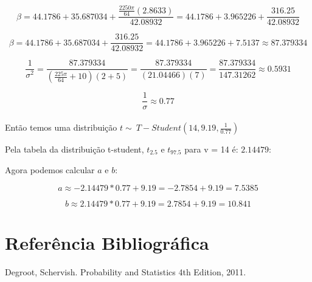 \documentclass{article}
\begin{document}
	$$\beta = 44.1786 + 35.687034 + \frac{\frac{2250\pi}{64}(2.8633)}{42.08932} = 44.1786 + 3.965226 + \frac{316.25}{42.08932}$$
	
	$$\beta = 44.1786 + 35.687034 + \frac{316.25}{42.08932} = 44.1786 + 3.965226 + 7.5137 \approx 87.379334$$
	
	$$\frac{1}{\sigma^2} = \frac{87.379334}{(\frac{225\pi}{64} + 10)(2 + 5)} = \frac{87.379334}{(21.04466)(7)} = \frac{87.379334}{147.31262}\approx 0.5931$$
	
	$$\frac{1}{\sigma} \approx 0.77$$\\
	
	Então temos uma distribuição $t \sim\ T-Student(14, 9.19, \frac{1}{0.77})$
	
	Pela tabela da distribuição t-student, $t_{2.5}$ e $t_{97.5}$ para v = 14 é: $2.14479$: 
	
	Agora podemos calcular $a$ e $b$:
	
	$$a \approx -2.14479 * 0.77 + 9.19 = -2.7854 + 9.19 = 7.5385$$
	
	$$b\approx 2.14479 * 0.77 + 9.19 = 2.7854 + 9.19 = 10.841$$
	 
	\newpage 
	
	\section{Referência Bibliográfica}
	
	Degroot, Schervish. Probability and Statistics 4th Edition, 2011.
	
\end{document}
